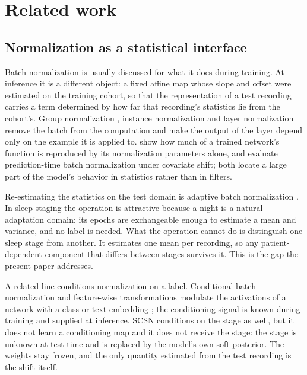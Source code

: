 \section{Related work}
\label{sec:related}

\subsection{Normalization as a statistical interface}

Batch normalization \citep{ioffe2015bn} is usually discussed for what it does
during training. At inference it is a different object: a fixed affine map
whose slope and offset were estimated on the training cohort, so that the
representation of a test recording carries a term determined by how far that
recording's statistics lie from the cohort's. Group normalization
\citep{wu2018group}, instance normalization \citep{ulyanov2016instance} and
layer normalization \citep{ba2016layer} remove the batch from the computation
and make the output of the layer depend only on the example it is applied to.
\citet{frankle2021bn} show how much of a trained network's function is
reproduced by its normalization parameters alone, and \citet{nado2020}
evaluate prediction-time batch normalization under covariate shift; both
locate a large part of the model's behavior in statistics rather than in
filters.

Re-estimating the statistics on the test domain is adaptive batch
normalization \citep{li2018adabn}. In sleep staging the operation is
attractive because a night is a natural adaptation domain: its epochs are
exchangeable enough to estimate a mean and variance, and no label is needed.
What the operation cannot do is distinguish one sleep stage from another. It
estimates one mean per recording, so any patient-dependent component that
differs between stages survives it. This is the gap the present paper
addresses.

A related line conditions normalization on a label. Conditional batch
normalization and feature-wise transformations modulate the activations of a
network with a class or text embedding
\citep{devries2017modulating,dumoulin2018feature,perez2018film}; the
conditioning signal is known during training and supplied at inference. SCSN
conditions on the stage as well, but it does not learn a conditioning map and
it does not receive the stage: the stage is unknown at test time and is
replaced by the model's own soft posterior. The weights stay frozen, and the
only quantity estimated from the test recording is the shift itself.

